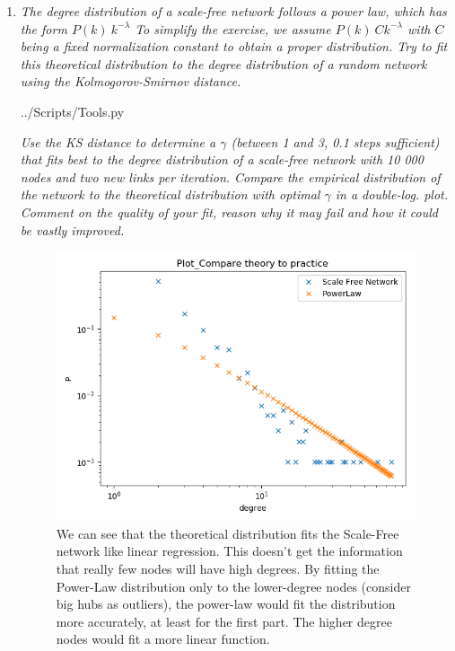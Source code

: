 \documentclass[10pt,a4paper]{article}
\begin{document}
\begin{enumerate}
\item \textit{The degree distribution of a scale-free network follows a power law, which has the form $P(k) ~ k^{-\lambda}$ To simplify the exercise, we assume $P(k) ~ Ck^{-\lambda}$ with $C$ being a fixed normalization
	constant to obtain a proper distribution. Try to fit this theoretical distribution to the
	degree distribution of a random network using the Kolmogorov-Smirnov distance. }




 {../Scripts/Tools.py}

\textit{Use the KS distance to determine a $\gamma$ (between 1 and 3, 0.1 steps sufficient) that fits
	best to the degree distribution of a scale-free network with 10 000 nodes and two new
	links per iteration. Compare the empirical distribution of the network to the theoretical
	distribution with optimal $\gamma$ in a double-log. plot. Comment on the quality of your fit,
	reason why it may fail and how it could be vastly improved.}


\begin{figure}[H]
	\centering
	\includegraphics[width=0.7\linewidth]{"../Scripts/Plot_Compare theory to practice"}
	\caption[Theory vs Practice]{We can see that the theoretical distribution fits the Scale-Free network like linear regression. This doesn't get the information that really few nodes will have high degrees. By fitting the Power-Law distribution only to the lower-degree nodes (consider big hubs as outliers), the power-law would fit the distribution more accurately, at least for the first part. The higher degree nodes would fit a more linear function.}
	\label{fig:compare-theory-to-practice}
\end{figure}

\end{enumerate}
\end{document}
